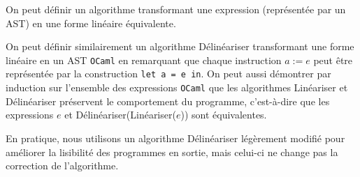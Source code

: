 On peut définir un algorithme transformant une expression (représentée par un
AST) en une forme linéaire équivalente.

\begin{algorithm}[H]
    \caption{Linéariser}

\end{algorithm}

On peut définir similairement un algorithme Délinéariser transformant une forme
linéaire en un AST \texttt{OCaml} en remarquant que chaque instruction $a := e$
peut être représentée par la construction \texttt{let a = e in}. On peut aussi
démontrer par induction sur l'ensemble des expressions \texttt{OCaml} que les
algorithmes Linéariser et Délinéariser préservent le comportement du programme,
c'est-à-dire que les expressions $e$ et Délinéariser(Linéariser($e$)) sont
équivalentes.

\begin{remark}
    En pratique, nous utilisons un algorithme Délinéariser légèrement modifié
    pour améliorer la lisibilité des programmes en sortie, mais celui-ci ne
    change pas la correction de l'algorithme.
\end{remark}
